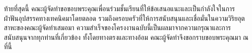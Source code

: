 \begin{acknowledgments}
ท้ายที่สุดนี้ คณะผู้จัดทำขอขอบพระคุณเพื่อนร่วมชั้นเรียนที่ให้ข้อเสนอแนะและเป็นกำลังใจในการฝ่าฟันอุปสรรคทางเทคนิคมาโดยตลอด รวมถึงครอบครัวที่ให้การสนับสนุนและเชื่อมั่นในความวิริยอุตสาหะของคณะผู้จัดทำเสมอมา ความสำเร็จของโครงงานฉบับนี้เป็นผลมาจากความกรุณาและการสนับสนุนจากทุกท่านที่เกี่ยวข้อง ทั้งโดยทางตรงและทางอ้อม คณะผู้จัดทำจึงขอกราบขอบพระคุณมา ณ ที่นี้


\end{acknowledgments}

\fi %

\contentspage

\ifproject
\figurelistpage
\tablelistpage
\fi